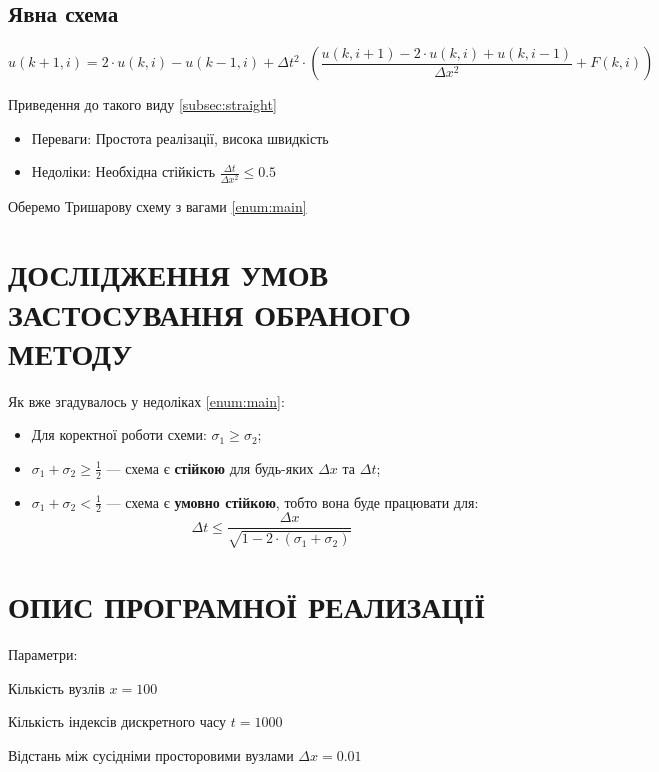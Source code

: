 \documentclass{article}
\begin{document}
        \subsection{Явна схема}
            \label{enum:straight}
            $$ u(k+1, i) = 2 \cdot u(k, i) - u(k-1, i) + \Delta{t}^2 \cdot \left( \frac{u(k, i+1) - 2 \cdot u(k, i) + u(k, i-1)}{\Delta{x}^2} + F(k, i) \right) $$

            Приведення до такого виду \eqref{subsec:straight}

            \begin{itemize}
                \item Переваги: Простота реалізації, висока швидкість
                \item Недоліки\label{itemz:straight}: Необхідна стійкість $ \frac{\Delta{t}}{\Delta{x}^2} \leq 0.5 $
            \end{itemize}

        Оберемо Тришарову схему з вагами \eqref{enum:main}

    \newpage
    \section{ДОСЛІДЖЕННЯ УМОВ ЗАСТОСУВАННЯ ОБРАНОГО МЕТОДУ}

    Як вже згадувалось у недоліках \eqref{enum:main}:

    \begin{itemize}
        \item Для коректної роботи схеми: $ \sigma_1 \geq \sigma_2 $;
        \item $ \sigma_1 + \sigma_2 \geq \frac{1}{2} $ --- схема є \textbf{стійкою} для будь-яких $ \Delta{x} $ та $ \Delta{t} $;
        \item $ \sigma_1 + \sigma_2 < \frac{1}{2} $ --- схема є \textbf{умовно стійкою}, тобто вона буде працювати для:
        $$ \Delta{t} \leq \frac{\Delta{x}}{\sqrt{1 - 2 \cdot(\sigma_1 + \sigma_2)}} $$
    \end{itemize}

    \newpage
    \section{ОПИС ПРОГРАМНОЇ РЕАЛИЗАЦІЇ}
        Параметри:

        Кількість вузлів $ x = 100 $
        
        Кількість індексів дискретного часу $ t = 1000 $
        
        Відстань між сусідніми просторовими вузлами $ \Delta{x} = 0.01 $
        
\end{document}
